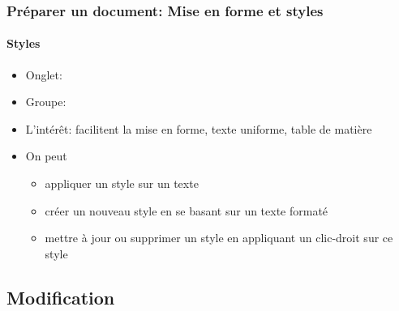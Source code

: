 \documentclass[xcolor=table]{beamer}
\begin{document}
\begin{frame}
\frametitle{Préparer un document: Mise en forme et styles}
\framesubtitle{Styles}

\begin{minipage}{0.58\textwidth}
\begin{itemize}
	\item Onglet: 
	\item Groupe: 
	\item L'intérêt: facilitent la mise en forme, texte uniforme, table de matière
	\item On peut
	\begin{itemize}
		\item appliquer un style sur un texte
		\item créer un nouveau style en se basant sur un texte formaté
		\item mettre à jour ou supprimer un style en appliquant un clic-droit sur ce style
	\end{itemize}
\end{itemize}
\end{minipage}
\begin{minipage}{0.4\textwidth}
	
	\vspace{12pt}
	
\end{minipage}

\end{frame}

\subsection{Modification}%
\end{document}
